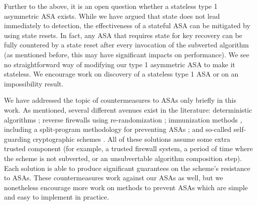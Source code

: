 Further to the above, it is an open question whether a stateless type 1 asymmetric ASA exists. While we have argued that state does not lead immediately to detection, the effectiveness of a stateful ASA can be mitigated by using state resets. In fact, any ASA that requires state for key recovery can be fully countered by a state reset after every invocation of the subverted algorithm (as mentioned before, this may have significant impacts on performance). We see no straightforward way of modifying our type 1 asymmetric ASA to make it stateless. We encourage work on discovery of a stateless type 1 ASA or on an impossibility result.

We have addressed the topic of countermeasures to ASAs only briefly in this work. As mentioned, several different avenues exist in the literature: deterministic algorithms \cite{C:BelPatRog14,FSE:DegFarPoe15,CCS:BelJaeKan15}; reverse firewalls using re-randomization \cite{CCS:AteMagVen15}; immunization methods \cite{ACNS:AFMV19}, including a split-program methodology for preventing ASAs \cite{CCS:RTYZ17,AC:RTYZ16,CCS:TanYun17}; and so-called self-guarding cryptographic schemes \cite{CSF:FisMaz18}. All of these solutions assume some extra trusted component (for example, a trusted firewall system, a period of time where the scheme is not subverted, or an unsubvertable algorithm composition step). Each solution is able to produce significant guarantees on the scheme's resistance to ASAs. These countermeasures work against our ASAs as well, but we nonetheless encourage more work on methods to prevent ASAs which are simple and easy to implement in practice.
